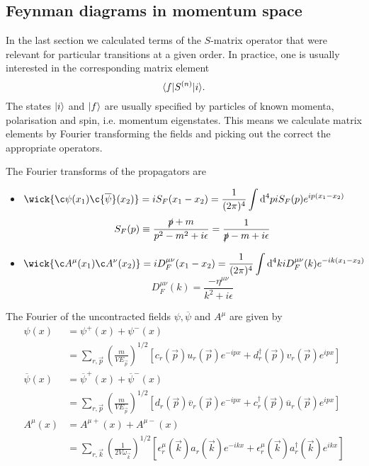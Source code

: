 \subsection{Feynman diagrams in momentum space}
In the last section we calculated terms of the $S$-matrix operator that were relevant for particular transitions at a given order. In practice, one is usually interested in the corresponding matrix element
\[ \braket[S^{(n)}]{f}{i}. \]
The states $\left| i \right\rangle$ and $\left| f \right\rangle$ are usually specified by particles of known momenta, polarisation and spin, i.e. momentum eigenstates. This means we calculate matrix elements by Fourier transforming the fields and picking out the correct the appropriate operators.

The Fourier transforms of the propagators are
\begin{itemize}
\item $\displaystyle\wick{\c\psi(x_1)\c{\overline{\psi}}(x_2)} = iS_F(x_1-x_2) = \frac{1}{(2\pi)^4}\int \diff{^4p}iS_F(p)e^{ip(x_1-x_2)}$
\[ S_F(p) \equiv \frac{\slashed{p}+m}{p^2-m^2 + i\epsilon} = \frac{1}{\slashed{p}-m+i\epsilon} \]
\item $\displaystyle\wick{\c A^\mu(x_1)\c A^\nu(x_2)} = i D^{\mu\nu}_F(x_1-x_2) = \frac{1}{(2\pi)^4}\int \diff{^4 k}iD_F^{\mu\nu}(k) e^{-ik(x_1-x_2)}$
\[ D_F^{\mu\nu}(k) = \frac{-\eta^{\mu\nu}}{k^2+i\epsilon} \]
\end{itemize}

The Fourier of the uncontracted fields $\psi, \overline{\psi}$ and $A^\mu$ are given by
\begin{align*}
\psi(x) &= \psi^+(x) + \psi^-(x) \\
&= \sum_{r, \vec{p}}\left(\frac{m}{VE_{\vec{p}}}\right)^{1/2}\left[c_r(\vec{p})u_r(\vec{p})e^{-ipx} + d^\dagger_r(\vec{p})v_r(\vec{p})e^{ipx}\right] \\
\overline{\psi}(x) &= \overline{\psi}^+(x) + \overline{\psi}^-(x) \\
&= \sum_{r, \vec{p}}\left(\frac{m}{VE_{\vec{p}}}\right)^{1/2}\left[d_r(\vec{p})\overline{v}_r(\vec{p})e^{-ipx} + c^\dagger_r(\vec{p})\overline{u}_r(\vec{p})e^{ipx}\right] \\
A^\mu(x) &= A^{\mu+}(x) + A^{\mu-}(x) \\
&= \sum_{r, \vec{k}}\left(\frac{1}{2V\omega_{\vec{k}}}\right)^{1/2}\left[\epsilon^\mu_r(\vec{k})a_r(\vec{k})e^{-ikx} + \epsilon^\mu_r(\vec{k})a^\dagger_{r}(\vec{k})e^{ikx}\right]
\end{align*}

